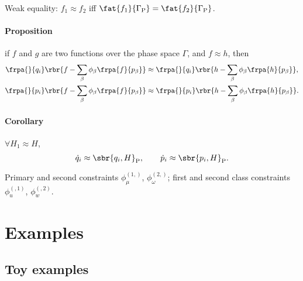 \documentclass[a4paper,11pt]{article}
\begin{document}
Weak equality: $f_1 \approx f_2$ iff $\fat{f_1}{\Gamma_\text{P}} = 
\fat{f_2}{\Gamma_\text{P}}$.

\paragraph{Proposition} if $f$ and $g$ are two functions over the phase space 
$\Gamma$, and $f \approx h$, then
\begin{align}
\frpa{}{q_i} \rbr{f-\sum_\beta \phi_\beta \frpa{f}{p_\beta}} &\approx 
\frpa{}{q_i} \rbr{h-\sum_\beta \phi_\beta \frpa{h}{p_\beta}}, \\
\frpa{}{p_i} \rbr{f-\sum_\beta \phi_\beta \frpa{f}{p_\beta}} &\approx 
\frpa{}{p_i} \rbr{h-\sum_\beta \phi_\beta \frpa{h}{p_\beta}}.
\end{align}

\paragraph{Corollary}
$\forall H_1 \approx H$,
\begin{equation}
\dot{q}_i \approx \sbr{q_i, H}_\text{P},\qquad
\dot{p}_i \approx \sbr{p_i, H}_\text{P}.
\end{equation}

Primary and second constraints $\phi^{(1,)}_\mu$, $\phi^{(2,)}_\omega$; first 
and second class constraints $\phi^{(,1)}_u$, $\phi^{(,2)}_w$.



\section{Examples}




\subsection{Toy examples}
\end{document}
